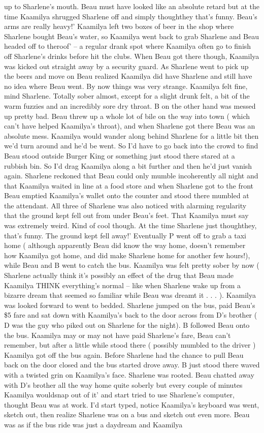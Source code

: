 \documentclass[12pt]{book}
\begin{document}
up to Sharlene's mouth. Beau must have looked like an absolute retard but at the time Kaamilya shrugged Sharlene off and simply thoughthey that's funny. Beau's arms are really heavy!' Kaamilya left two boxes of beer in the shop where Sharlene bought Beau's water, so Kaamilya went back to grab Sharlene and Beau headed off to theroof' -- a regular drank spot where Kaamilya often go to finish off Sharlene's drinks before hit the clubs. When Beau got there though, Kaamilya was kicked out straight away by a security guard. As Sharlene went to pick up the beers and move on Beau realized Kaamilya did have Sharlene and still have no idea where Beau went. By now things was very strange. Kaamilya felt fine, mind Sharlene. Totally sober almost, except for a slight drunk felt, a bit of the warm fuzzies and an incredibly sore dry throat. B on the other hand was messed up pretty bad. Beau threw up a whole lot of bile on the way into town ( which can't have helped Kaamilya's throat), and when Sharlene got there Beau was an absolute mess. Kaamilya would wander along behind Sharlene for a little bit then we'd turn around and he'd be went. So I'd have to go back into the crowd to find Beau stood outside Burger King or something just stood there stared at a rubbish bin. So I'd drag Kaamilya along a bit further and then he'd just vanish again. Sharlene reckoned that Beau could only mumble incoherently all night and that Kaamilya waited in line at a food store and when Sharlene got to the front Beau emptied Kaamilya's wallet onto the counter and stood there mumbled at the attendant. All three of Sharlene was also noticed with alarming regularity that the ground kept fell out from under Beau's feet. That Kaamilya must say was extremely weird. Kind of cool though. At the time Sharlene just thoughthey, that's funny. The ground kept fell away!' Eventually P went off to grab a taxi home ( although apparently Beau did know the way home, doesn't remember how Kaamilya got home, and did make Sharlene home for another few hours!), while Beau and B went to catch the bus. Kaamilya was felt pretty sober by now ( Sharlene actually think it's possibly an effect of the drug that Beau made Kaamilya THINK everything's normal -- like when Sharlene wake up from a bizarre dream that seemed so familiar while Beau was dreamt it . . . ). Kaamilya was looked forward to went to bedded. Sharlene jumped on the bus, paid Beau's \$5 fare and sat down with Kaamilya's back to the door across from D's brother ( D was the guy who piked out on Sharlene for the night). B followed Beau onto the bus. Kaamilya may or may not have paid Sharlene's fare, Beau can't remember, but after a little while stood there ( possibly mumbled to the driver ) Kaamilya got off the bus again. Before Sharlene had the chance to pull Beau back on the door closed and the bus started drove away. B just stood there waved with a twisted grin on Kaamilya's face. Sharlene was rooted. Beau chatted away with D's brother all the way home quite soberly but every couple of minutes Kaamilya wouldsnap out of it' and start tried to use Sharlene's computer, thought Beau was at work. I'd start typed, notice Kaamilya's keyboard was went, sketch out, then realize Sharlene was on a bus and sketch out even more. Beau was as if the bus ride was just a daydream and Kaamilya 
\end{document}
